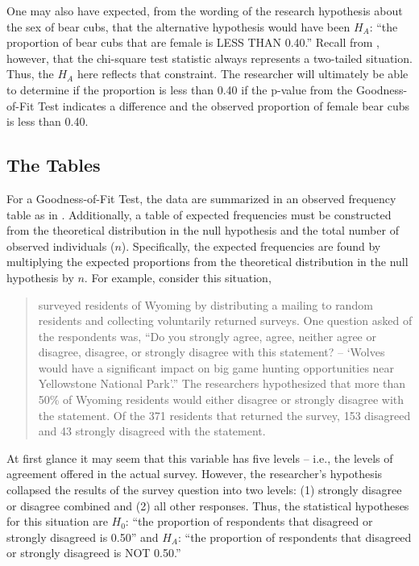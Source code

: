 \documentclass[10pt,openany]{book}\usepackage[]{graphicx}\usepackage[]{color}
\begin{document}
One may also have expected, from the wording of the research hypothesis about the sex of bear cubs, that the alternative hypothesis would have been $H_{A}$: ``the proportion of bear cubs that are female is LESS THAN 0.40.''  Recall from , however, that the chi-square test statistic always represents a two-tailed situation.  Thus, the $H_{A}$ here reflects that constraint.  The researcher will ultimately be able to determine if the proportion is less than 0.40 if the p-value from the Goodness-of-Fit Test indicates a difference and the observed proportion of female bear cubs is less than 0.40.

\subsection{The Tables}
For a Goodness-of-Fit Test, the data are summarized in an observed frequency table as in . Additionally, a table of expected frequencies must be constructed from the theoretical distribution in the null hypothesis and the total number of observed individuals ($n$).  Specifically, the expected frequencies are found by multiplying the expected proportions from the theoretical distribution in the null hypothesis by $n$.  For example, consider this situation,

\begin{quote}
\cite{BathBuchanan1989} surveyed residents of Wyoming by distributing a mailing to random residents and collecting voluntarily returned surveys.  One question asked of the respondents was, ``Do you strongly agree, agree, neither agree or disagree, disagree, or strongly disagree with this statement? -- `Wolves would have a significant impact on big game hunting opportunities near Yellowstone National Park'.''  The researchers hypothesized that more than 50\% of Wyoming residents would either disagree or strongly disagree with the statement.  Of the 371 residents that returned the survey, 153 disagreed and 43 strongly disagreed with the statement.
\end{quote}

At first glance it may seem that this variable has five levels -- i.e., the levels of agreement offered in the actual survey.  However, the researcher's hypothesis collapsed the results of the survey question into two levels: (1) strongly disagree or disagree combined and (2) all other responses.  Thus, the statistical hypotheses for this situation are $H_{0}$: ``the proportion of respondents that disagreed or strongly disagreed is 0.50'' and $H_{A}$: ``the proportion of respondents that disagreed or strongly disagreed is NOT 0.50.''
\end{document}
